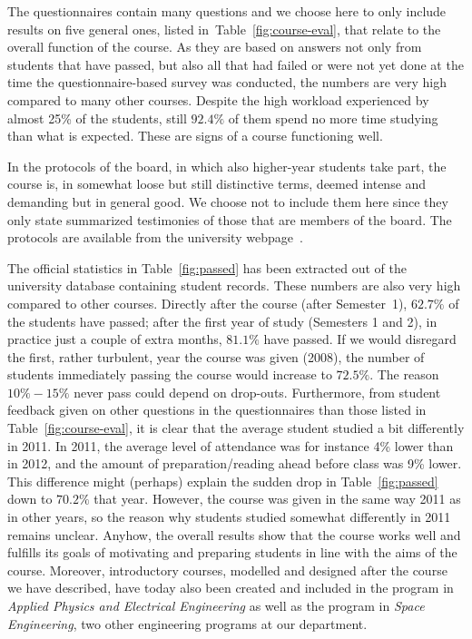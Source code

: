 \documentclass[conference]{IEEEtran}
\begin{document}
The questionnaires contain many questions and we choose here to only include results on five general ones, listed in~Table~\ref{fig:course-eval}, that relate to the overall function of the course. As they are based on answers not only from students that have passed, but also all that had failed or were not yet done at the time the questionnaire-based survey was conducted, the numbers are very high compared to many other courses. Despite the high workload experienced by almost 25\% of the students, still $92.4\%$ of them spend no more time studying than what is expected. These are signs of a course functioning well. 

In the protocols of the board, in which also higher-year students take part, the course is, in somewhat loose but still distinctive terms, deemed intense and demanding but in general good. We choose not to include them here since they only state summarized testimonies of those that are members of the board. The protocols are available from the university webpage~\cite{programrad}. 

The official statistics in Table~\ref{fig:passed} has been extracted out of the university database containing student records. These numbers are also very high compared to other courses. Directly after the course (after Semester~1), $62.7\%$ of the students have passed; after the first year of study (Semesters 1 and 2), in practice just a couple of extra months, $81.1\%$ have passed. If we would disregard the first, rather turbulent, year the course was given (2008), the number of students immediately passing the course would increase to $72.5\%$. The reason $10\%-15\%$ never pass could depend on drop-outs. 
Furthermore, from student feedback given on other questions in the questionnaires than those listed in Table~\ref{fig:course-eval}, it is clear that the average student studied a bit differently in 2011.  In 2011, the average level of attendance was for instance 4\% lower than in 2012, and the amount of preparation/reading ahead before class was 9\% lower. This difference might (perhaps) explain the sudden drop in Table~\ref{fig:passed} down to $70.2\%$ that year. However, the course was given in the same way 2011 as in other years, so the reason why students studied somewhat differently in 2011 remains unclear. 
Anyhow, the overall results show that the course works well and fulfills its goals of motivating and preparing students in line with the aims of the course. 
Moreover, introductory courses, modelled and designed after the course we have described, have today also been created and included in the program in \emph{Applied Physics and Electrical Engineering} as well as the program in \emph{Space Engineering}, two other engineering programs at our department.
\end{document}
